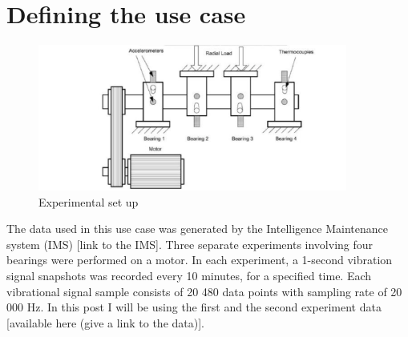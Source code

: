 \documentclass[11pt, oneside]{article}   	%
\begin{document}
\section{Defining the use case}
\begin{figure}[H] %
   \centering
   \includegraphics[width=4in]{experiment} 
   \caption{Experimental set up}
   \label{fig:exp}
\end{figure}
The data used in this use case was generated by the Intelligence Maintenance system (IMS) [link to the IMS].
Three separate experiments involving four bearings were performed on a motor. In each experiment, a 1-second vibration signal snapshots was recorded every 10 minutes, for a specified time. Each vibrational signal sample consists of 20 480 data points with sampling rate of 20 000 Hz.
In this post I will be using the first and the second experiment data [available here (give a link to the data)].
\end{document}
